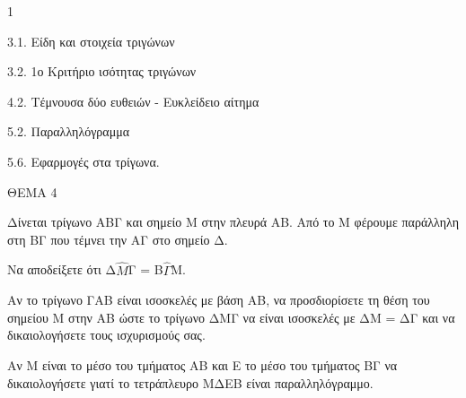 \begin{ylh}{1}
    \item 3.1. Είδη και στοιχεία τριγώνων
    \item 3.2. 1ο Κριτήριο ισότητας τριγώνων
    \item 4.2. Τέμνουσα δύο ευθειών - Ευκλείδειο αίτημα
    \item 5.2. Παραλληλόγραμμα
    \item 5.6. Εφαρμογές στα τρίγωνα.
\end{ylh}

ΘΕΜΑ 4

Δίνεται τρίγωνο ΑΒΓ και σημείο Μ στην πλευρά ΑΒ. Από το Μ φέρουμε παράλληλη στη ΒΓ που τέμνει την ΑΓ στο σημείο Δ.

\begin{alist}
\item Να αποδείξετε ότι Δ$\widehat{Μ}$Γ = Β$\widehat{\Gamma}$Μ. 

\item Αν το τρίγωνο ΓΑΒ είναι ισοσκελές με βάση ΑΒ, να προσδιορίσετε τη θέση του σημείου Μ στην ΑΒ ώστε το τρίγωνο ΔΜΓ να είναι ισοσκελές με ΔΜ = ΔΓ και να δικαιολογήσετε τους ισχυρισμούς σας. 

\item Αν Μ είναι το μέσο του τμήματος ΑΒ και Ε το μέσο του τμήματος ΒΓ να δικαιολογήσετε γιατί το τετράπλευρο ΜΔΕΒ είναι παραλληλόγραμμο. 
\end{alist}
